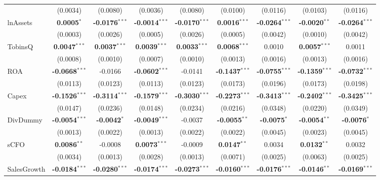 \documentclass[11pt,a4paper]{article}
\begin{document}
\begin{table}[htbp]
\begin{tabular}{lcccccccc}
 & (0.0034) & (0.0080) & (0.0036) & (0.0080) & (0.0100) & (0.0116) & (0.0103) & (0.0116) \\
lnAssets & \textbf{0.0005}$^{*}$ & \textbf{-0.0176}$^{***}$ & \textbf{-0.0014}$^{***}$ & \textbf{-0.0170}$^{***}$ & \textbf{0.0016}$^{***}$ & \textbf{-0.0264}$^{***}$ & \textbf{-0.0020}$^{**}$ & \textbf{-0.0264}$^{***}$ \\
 & (0.0003) & (0.0026) & (0.0005) & (0.0026) & (0.0005) & (0.0042) & (0.0010) & (0.0042) \\
TobinsQ & \textbf{0.0047}$^{***}$ & \textbf{0.0037}$^{***}$ & \textbf{0.0039}$^{***}$ & \textbf{0.0033}$^{***}$ & \textbf{0.0068}$^{***}$ & 0.0010 & \textbf{0.0057}$^{***}$ & 0.0011 \\
 & (0.0008) & (0.0010) & (0.0007) & (0.0010) & (0.0013) & (0.0016) & (0.0013) & (0.0016) \\
ROA & \textbf{-0.0668}$^{***}$ & -0.0166 & \textbf{-0.0602}$^{***}$ & -0.0141 & \textbf{-0.1437}$^{***}$ & \textbf{-0.0755}$^{***}$ & \textbf{-0.1359}$^{***}$ & \textbf{-0.0732}$^{***}$ \\
 & (0.0113) & (0.0123) & (0.0113) & (0.0123) & (0.0173) & (0.0196) & (0.0173) & (0.0198) \\
Capex & \textbf{-0.1526}$^{***}$ & \textbf{-0.3114}$^{***}$ & \textbf{-0.1579}$^{***}$ & \textbf{-0.3030}$^{***}$ & \textbf{-0.2273}$^{***}$ & \textbf{-0.3413}$^{***}$ & \textbf{-0.2402}$^{***}$ & \textbf{-0.3425}$^{***}$ \\
 & (0.0147) & (0.0236) & (0.0148) & (0.0234) & (0.0216) & (0.0348) & (0.0220) & (0.0349) \\
DivDummy & \textbf{-0.0054}$^{***}$ & \textbf{-0.0042}$^{*}$ & \textbf{-0.0049}$^{***}$ & -0.0037 & \textbf{-0.0055}$^{**}$ & \textbf{-0.0075}$^{*}$ & \textbf{-0.0054}$^{**}$ & \textbf{-0.0076}$^{*}$ \\
 & (0.0013) & (0.0022) & (0.0013) & (0.0022) & (0.0022) & (0.0045) & (0.0023) & (0.0045) \\
sCFO & \textbf{0.0086}$^{**}$ & -0.0008 & \textbf{0.0073}$^{***}$ & -0.0009 & \textbf{0.0147}$^{**}$ & 0.0034 & \textbf{0.0132}$^{**}$ & 0.0032 \\
 & (0.0034) & (0.0013) & (0.0028) & (0.0013) & (0.0071) & (0.0025) & (0.0063) & (0.0025) \\
SalesGrowth & \textbf{-0.0184}$^{***}$ & \textbf{-0.0280}$^{***}$ & \textbf{-0.0174}$^{***}$ & \textbf{-0.0273}$^{***}$ & \textbf{-0.0160}$^{***}$ & \textbf{-0.0176}$^{***}$ & \textbf{-0.0146}$^{**}$ & \textbf{-0.0169}$^{***}$ \\

\end{tabular}
\end{table}
\end{document}
